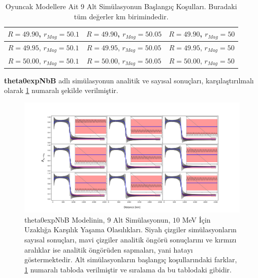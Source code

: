 \begin{table}[hbt!]
    \centering
    \begin{tabular}{|c|c|c|}
        \hline $ R=49.90 $, $ r_{Mag}=50.1 $& $ R=49.90 $, $ r_{Mag}=50.05 $ & $ R= 49.90$, $ r_{Mag}=50 $\\
        \hline $ R=49.95 $, $ r_{Mag}=50.1 $& $ R=49.95 $, $ r_{Mag}=50.05 $ & $ R= 49.95$, $ r_{Mag}=50 $\\
        \hline $ R=50.00 $, $ r_{Mag}=50.1 $& $ R= 50.00$, $ r_{Mag}=50.05 $ & $ R= 50.00$, $ r_{Mag}=50 $\\
        \hline
    \end{tabular}
    \caption[Oyuncak Modellere Ait 9 Alt Simülasyonun Başlangıç Koşulları.]{\label{tab:oyuncakModel9BasKosul}Oyuncak Modellere Ait 9 Alt Simülasyonun Başlangıç Koşulları. Buradaki tüm değerler km birimindedir.}
\end{table}

\textbf{theta0expNbB} adlı simülasyonun analitik ve sayısal sonuçları, karşılaştırılmalı olarak \ref{fig:theta0expNbB_9x9_10MeV} numaralı şekilde verilmiştir.

\begin{figure}[hbt!]
    \centering
    \includegraphics[width=1\textwidth]{figures/theta0expNbB_9x9_10MeV.pdf}
    \caption[theta0expNbB Modelinin, 9 Alt Simülasyonun, $ 10 $ MeV İçin Uzaklığa Karşılık Yaşama Olasılıkları.]{theta0expNbB Modelinin, 9 Alt Simülasyonun, $ 10 $ MeV İçin Uzaklığa Karşılık Yaşama Olasılıkları. Siyah çizgiler simülasyonların sayısal sonuçları, mavi çizgiler analitik öngörü sonuçlarını ve kırmızı aralıklar ise analitik öngörüden sapmaları, yani hatayı göstermektedir. Alt simülasyonların başlangıç koşullarındaki farklar, \ref{tab:oyuncakModel9BasKosul} numaralı tabloda verilmiştir ve sıralama da bu tablodaki gibidir.}
    \label{fig:theta0expNbB_9x9_10MeV}
\end{figure}

